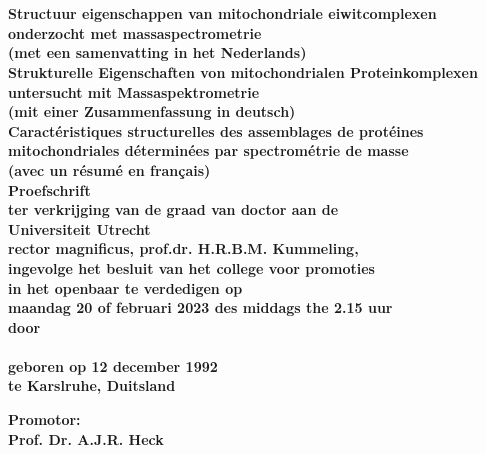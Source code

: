 \begin{titlepage}
\begin{center}
{\huge \bfseries \thesistitle \par \ }\\
[0.5cm]
{\small \bfseries Structuur eigenschappen van mitochondriale eiwitcomplexen onderzocht met massaspectrometrie\\
(met een samenvatting in het Nederlands)}\\
[0.25cm]
{\small \bfseries Strukturelle Eigenschaften von mitochondrialen Proteinkomplexen untersucht mit Massaspektrometrie\\
(mit einer Zusammenfassung in deutsch)}\\
[0.25cm]
{\small \bfseries Caractéristiques structurelles des assemblages de protéines mitochondriales déterminées par spectrométrie de masse\\
(avec un résumé en français)}\\
[2cm]
{\Large \bfseries Proefschrift}\\
\bigskip
\bigskip
{\small \bfseries ter verkrijging van de graad van doctor aan de\\
Universiteit Utrecht\\
rector magnificus, prof.dr. H.R.B.M. Kummeling,\\
ingevolge het besluit van het college voor promoties\\
in het openbaar te verdedigen op\\
\bigskip
maandag 20 of februari 2023 des middags the 2.15 uur}\\
[1cm]
{\small \bfseries door}\\
[1cm]

{\large \bfseries\name\\
\smallskip
\small geboren op 12 december 1992\\
te Karslruhe, Duitsland}

\end{center}

\clearpage

\begin{flushleft}
    {\bfseries Promotor:\\
    \small Prof. Dr. A.J.R. Heck}
\end{flushleft}    

\end{titlepage}